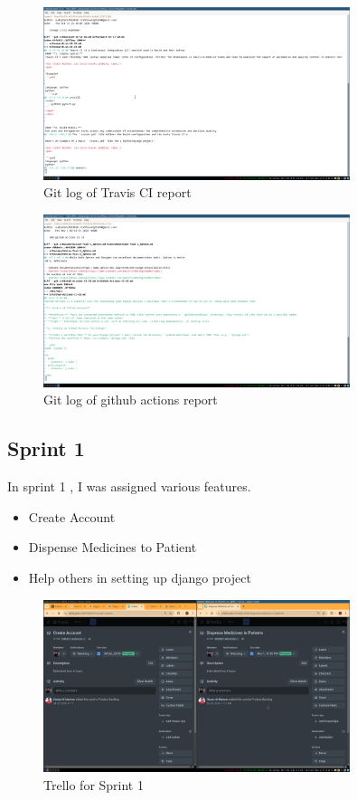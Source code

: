 \documentclass[a4paper,12pt]{article}
\begin{document}
\begin{figure}[H]
    \centering
    \includegraphics[width=0.8\textwidth]{images/git_cicd_travis.png}
    \caption{Git log of Travis CI report}
    \label{fig:gitcicd}
\end{figure}


\begin{figure}[H]
    \centering
    \includegraphics[width=0.8\textwidth]{images/git_cicd_github.png}
    \caption{Git log of github actions report}
    \label{fig:githubactins}
\end{figure}


\subsection{Sprint 1}
In sprint 1 , I was assigned various features.
\begin{itemize}
    \item Create Account
    \item Dispense Medicines to Patient
    \item Help others in setting up django project
\end{itemize}
\begin{figure}[H]
    \centering
    \includegraphics[width=0.8\textwidth]{images/trello_sprint1.png}
    \caption{Trello for Sprint 1}
    \label{fig:trellosprint1}
\end{figure}
\end{document}

